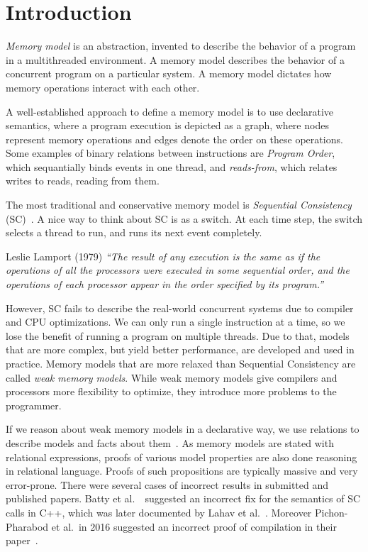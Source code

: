 \section*{Introduction}
\setcounter{section}{1}

\emph{Memory model} is an abstraction, invented to describe the behavior of a program in a multithreaded environment. A memory model describes the behavior of a concurrent program on a particular system. A memory model dictates how memory operations interact with each other. 

A well-established approach to define a memory model is to use declarative semantics, where a program execution is depicted as a graph, where nodes represent memory operations and edges denote the order on these operations. Some examples of binary relations between instructions are \emph{Program Order}, which sequantially binds events in one thread, and \emph{reads-from}, which relates writes to reads, reading from them. 

The most traditional and conservative memory model is \emph{Sequential Consistency} (SC)~\cite{lamport_tc79}. A nice way to think about SC is as a switch. At each time step, the switch selects a thread to run, and runs its next event completely.
\begin{aquote}{Leslie Lamport (1979)}
    \textit{``The result of any execution is the same as if the
    operations of all the processors were executed in
    some sequential order, and the operations of each
    processor appear in the order specified by its
    program.''}
\end{aquote}

However, SC fails to describe the real-world concurrent systems due to compiler and CPU optimizations. We can only run a single instruction at a time, so we lose the benefit of running a program on multiple threads. Due to that, models that are more complex, but yield better performance, are developed and used in practice. Memory models that are more relaxed than Sequential Consistency are called \emph{weak memory models}. While weak memory models give compilers and processors more flexibility to optimize, they introduce more problems to the programmer. 


If we reason about weak memory models in a declarative way, we use relations to describe models and facts about them~\cite{Alglave-al:TOPLAS14}. As memory models are stated with relational expressions, proofs of various model properties are also done reasoning in relational language. Proofs of such propositions are typically massive and very error-prone. There were several cases of incorrect results in submitted and published papers. Batty et al.~\cite{batty_2016}\ suggested an incorrect fix for the semantics of SC calls in C++, which was later documented by Lahav et al.~\cite{lahav2017repairing}. Moreover Pichon-Pharabod et al.\  in 2016 suggested an incorrect proof of compilation in their paper~\cite{PichonPharabod_Sewell16}. 

